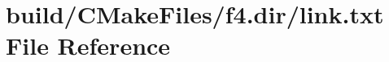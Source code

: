 \hypertarget{f4_8dir_2link_8txt}{}\section{build/\+C\+Make\+Files/f4.dir/link.txt File Reference}
\label{f4_8dir_2link_8txt}
